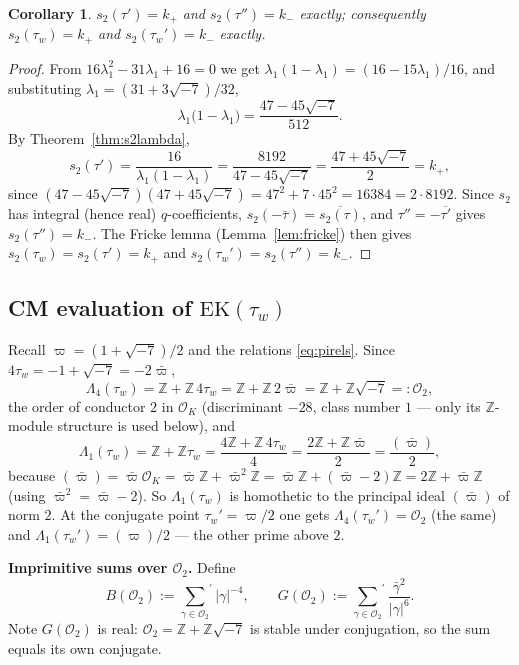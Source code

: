 \documentclass[11pt]{article}
\newtheorem{corollary}[theorem]{Corollary}
\theoremstyle{definition}
\theoremstyle{remark}
\newcommand{\Zz}{\mathbb{Z}}
\newcommand{\cL}{\Lambda}
\newcommand{\OO}{\mathcal{O}}
\begin{document}
\begin{corollary}\label{cor:s2valB}
$s_2(\tau')=k_+$ and $s_2(\tau'')=k_-$ exactly; consequently
$s_2(\tau_w)=k_+$ and $s_2(\tau_w')=k_-$ exactly.
\end{corollary}
\begin{proof}
From $16\lambda_1^2-31\lambda_1+16=0$ we get
$\lambda_1(1-\lambda_1)=(16-15\lambda_1)/16$, and substituting
$\lambda_1=(31+3\sqrt{-7})/32$,
\[
  \lambda_1\bigl(1-\lambda_1\bigr)=\frac{47-45\sqrt{-7}}{512}.
\]
By Theorem~\ref{thm:s2lambda},
\[
  s_2(\tau')=\frac{16}{\lambda_1(1-\lambda_1)}
  =\frac{8192}{47-45\sqrt{-7}}=\frac{47+45\sqrt{-7}}2=k_+,
\]
since $(47-45\sqrt{-7})(47+45\sqrt{-7})=47^2+7\cdot45^2=16384=2\cdot8192$.
Since $s_2$ has integral (hence real) $q$-coefficients,
$s_2(-\bar\tau)=\overline{s_2(\tau)}$, and $\tau''=-\overline{\tau'}$ gives
$s_2(\tau'')=k_-$. The Fricke lemma (Lemma~\ref{lem:fricke}) then gives
$s_2(\tau_w)=s_2(\tau')=k_+$ and $s_2(\tau_w')=s_2(\tau'')=k_-$.
\end{proof}

\subsection{CM evaluation of \texorpdfstring{$\mathrm{EK}(\tau_w)$}{EK(tauw)}}\label{subsec:P1B}

Recall $\varpi=(1+\sqrt{-7})/2$ and the relations \eqref{eq:pirels}. Since
$4\tau_w=-1+\sqrt{-7}=-2\bar\varpi$,
\begin{equation}\label{eq:L4B}
  \cL_4(\tau_w)=\Zz+\Zz\,4\tau_w=\Zz+\Zz\,2\bar\varpi=\Zz+\Zz\sqrt{-7}=:\OO_2,
\end{equation}
the order of conductor $2$ in $\OO_K$ (discriminant $-28$, class number
$1$ --- only its $\Zz$-module structure is used below), and
\begin{equation}\label{eq:L1B}
  \cL_1(\tau_w)=\Zz+\Zz\tau_w=\frac{4\Zz+\Zz\,4\tau_w}4
  =\frac{2\Zz+\Zz\bar\varpi}2=\frac{(\bar\varpi)}2,
\end{equation}
because
$(\bar\varpi)=\bar\varpi\OO_K=\bar\varpi\Zz+\bar\varpi^2\Zz
=\bar\varpi\Zz+(\bar\varpi-2)\Zz=2\Zz+\bar\varpi\Zz$
(using $\bar\varpi^2=\bar\varpi-2$). So $\cL_1(\tau_w)$ is homothetic to the
principal ideal $(\bar\varpi)$ of norm $2$. At the conjugate point
$\tau_w'=\varpi/2$ one gets $\cL_4(\tau_w')=\OO_2$ (the same) and
$\cL_1(\tau_w')=(\varpi)/2$ --- the other prime above $2$.

\textbf{Imprimitive sums over $\OO_2$.} Define
\[
  B(\OO_2):={\sum_{\gamma\in\OO_2}}^{\!\prime}|\gamma|^{-4},\qquad
  G(\OO_2):={\sum_{\gamma\in\OO_2}}^{\!\prime}\frac{\bar\gamma^2}{|\gamma|^6}.
\]
Note $G(\OO_2)$ is real: $\OO_2=\Zz+\Zz\sqrt{-7}$ is stable under
conjugation, so the sum equals its own conjugate.
\end{document}
